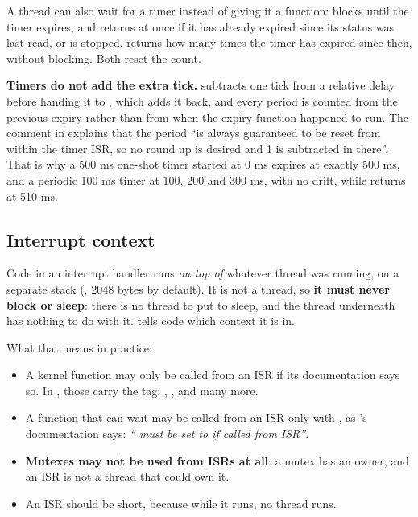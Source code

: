 A thread can also wait for a timer instead of giving it a function: 
blocks until the timer expires, and returns at once if it has already expired since its status was
last read, or is stopped.  returns how many times the timer has expired
since then, without blocking. Both reset the count.

\textbf{Timers do not add the extra tick.}  subtracts one tick from a relative
delay before handing it to , which adds it back, and every period is counted
from the previous expiry rather than from when the expiry function happened to run. The comment in
 explains that the period ``is always guaranteed to be reset from
within the timer ISR, so no round up is desired and 1 is subtracted in there''. That is why a 500 ms
one-shot timer started at 0 ms expires at exactly 500 ms, and a periodic 100 ms timer at 100, 200
and 300 ms, with no drift, while  returns at 510 ms.

\subsection{Interrupt context}
Code in an interrupt handler runs \emph{on top of} whatever thread was running, on a separate stack
(, 2048 bytes by default). It is not a thread, so \textbf{it must never
block or sleep}: there is no thread to put to sleep, and the thread underneath has nothing to do
with it.  tells code which context it is in.

What that means in practice:

\begin{itemize}
  \item A kernel function may only be called from an ISR if its documentation says so. In
    , those carry the  tag: ,
    ,  and many more.
  \item A function that can wait may be called from an ISR only with , as
    ’s documentation says: \emph{`` must be set to  if
    called from ISR''}.
  \item \textbf{Mutexes may not be used from ISRs at all}: a mutex has an owner, and an ISR is not a thread
    that could own it.
  \item An ISR should be short, because while it runs, no thread runs.
\end{itemize}

